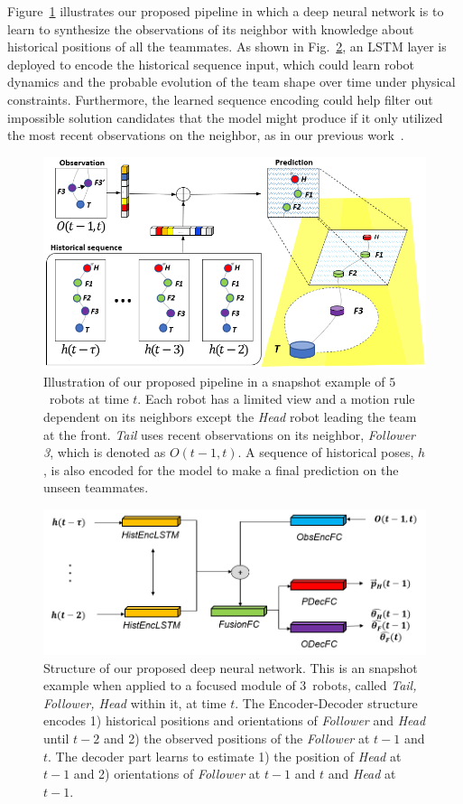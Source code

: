 \documentclass[letterpaper, 10 pt, conference]{ieeeconf}  %
\begin{document}
	Figure~\ref{fig:Concept} illustrates our proposed pipeline in which
	a deep neural network is to learn to synthesize the observations of its neighbor
	with knowledge about historical positions of all the teammates.
	As shown in Fig.~\ref{fig:DL_Pipeline}, an LSTM layer is deployed to encode
    the historical sequence input, which could learn robot dynamics and
    the probable evolution of the team shape over time under physical
    constraints. Furthermore, the learned sequence encoding could help
    filter out impossible solution candidates that the model might
    produce if it only utilized the most recent observations on the neighbor,
    as in our previous work~\cite{CPR17}.
	\begin{figure}\centering
		\includegraphics[width=1.\columnwidth]{fig_Concept}
		\caption{Illustration of our proposed pipeline in a snapshot example of
			$5$~robots at time $t$.
			Each robot has a limited view and a motion rule dependent on its neighbors
			except the \emph{Head} robot leading the team at the front.
			\emph{Tail} uses recent observations on its neighbor, \emph{Follower 3},
			which is denoted as $O(t-1,t)$. A sequence of historical poses, $h$, is
			also encoded for the model to make a final prediction on the
			unseen teammates.
		}
		\label{fig:Concept}
	\end{figure}
	\begin{figure}\centering
		\includegraphics[width=1.\columnwidth]{fig_DL_Pipeline}
		\caption{Structure of our proposed deep neural network.
			This is an snapshot example when applied to a focused module of
			$3$~robots, called \emph{Tail, Follower, Head} within it, at time $t$.
			The Encoder-Decoder structure encodes
			1) historical positions and orientations of \emph{Follower} and \emph{Head}
			until $t-2$ and 2) the observed positions of the \emph{Follower} at $t-1$ and $t$.
			The decoder part learns to estimate 1) the position of \emph{Head} at $t-1$ and
			2) orientations of \emph{Follower} at $t-1$ and $t$ and \emph{Head} at $t-1$.
		}
		\label{fig:DL_Pipeline}
	\end{figure}
\end{document}
